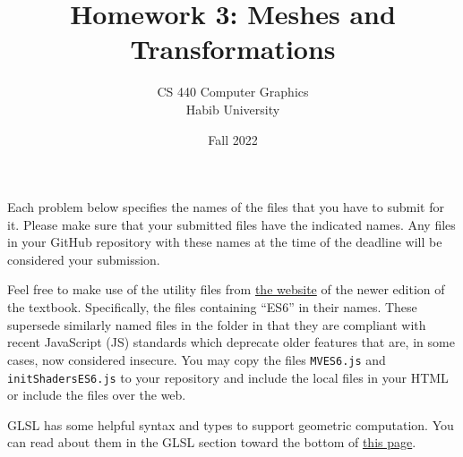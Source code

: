 \documentclass[addpoints]{exam}
\title{Homework 3: Meshes and Transformations}
\author{CS 440 Computer Graphics\\Habib University}
\date{Fall 2022}
\begin{document}
\maketitle

Each problem below specifies the names of the files that you have to submit for it. Please make sure that your submitted files have the indicated names. Any files in your GitHub repository with these names at the time of the deadline will be considered your submission.

Feel free to make use of the utility files from \href{https://bit.ly/3Bqt8XG}{the website} of the newer edition of the textbook. Specifically, the files containing ``ES6'' in their names. These supersede similarly named files in the folder in that they are compliant with recent JavaScript (JS) standards which deprecate older features that are, in some cases, now considered insecure. You may copy the files \texttt{MVES6.js} and \texttt{initShadersES6.js} to your repository and include the local files in your HTML or include the files over the web.

GLSL has some helpful syntax and types to support geometric computation. You can read about them in the GLSL section toward the bottom of \href{https://webgl2fundamentals.org/webgl/lessons/webgl-shaders-and-glsl.html}{this page}.
\end{document}
